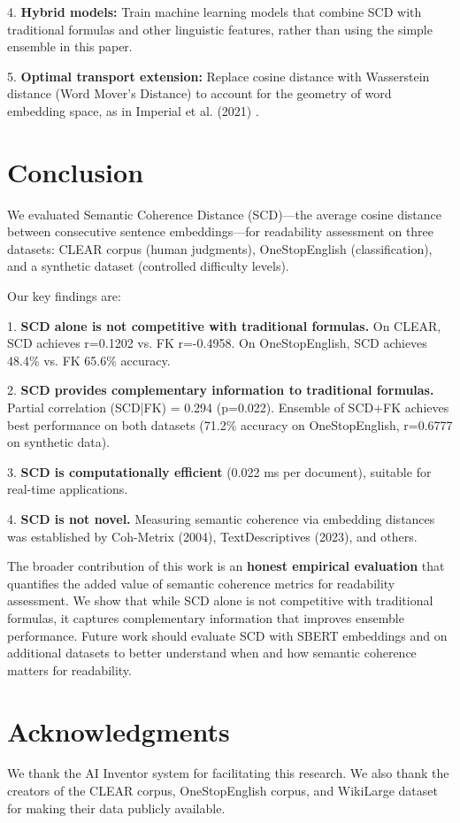 \documentclass[11pt,letterpaper]{article}
\begin{document}
4. \textbf{Hybrid models:} Train machine learning models that combine SCD with traditional formulas and other linguistic features, rather than using the simple ensemble in this paper.

5. \textbf{Optimal transport extension:} Replace cosine distance with Wasserstein distance (Word Mover's Distance) to account for the geometry of word embedding space, as in Imperial et al. (2021) \cite{Imperial2021WMD}.

\section{Conclusion}

We evaluated Semantic Coherence Distance (SCD)---the average cosine distance between consecutive sentence embeddings---for readability assessment on three datasets: CLEAR corpus (human judgments), OneStopEnglish (classification), and a synthetic dataset (controlled difficulty levels).

Our key findings are:

1. \textbf{SCD alone is not competitive with traditional formulas.} On CLEAR, SCD achieves r=0.1202 vs. FK r=-0.4958. On OneStopEnglish, SCD achieves 48.4\% vs. FK 65.6\% accuracy.

2. \textbf{SCD provides complementary information to traditional formulas.} Partial correlation (SCD|FK) = 0.294 (p=0.022). Ensemble of SCD+FK achieves best performance on both datasets (71.2\% accuracy on OneStopEnglish, r=0.6777 on synthetic data).

3. \textbf{SCD is computationally efficient} (0.022 ms per document), suitable for real-time applications.

4. \textbf{SCD is not novel.} Measuring semantic coherence via embedding distances was established by Coh-Metrix (2004), TextDescriptives (2023), and others.

The broader contribution of this work is an \textbf{honest empirical evaluation} that quantifies the added value of semantic coherence metrics for readability assessment. We show that while SCD alone is not competitive with traditional formulas, it captures complementary information that improves ensemble performance. Future work should evaluate SCD with SBERT embeddings and on additional datasets to better understand when and how semantic coherence matters for readability.

\section*{Acknowledgments}

We thank the AI Inventor system for facilitating this research. We also thank the creators of the CLEAR corpus, OneStopEnglish corpus, and WikiLarge dataset for making their data publicly available.



\end{document}
